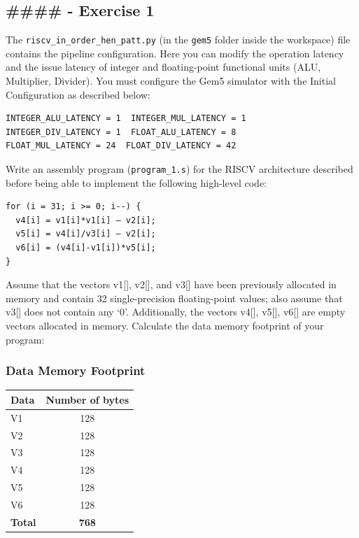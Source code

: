 \documentclass[11pt, a4paper]{article}
\begin{document}
\bigskip
\color{MyBlue}
\subsection*{\#\#\#\# - Exercise 1}
\color{black}
The \texttt{riscv\_in\_order\_hen\_patt.py} (in the \texttt{gem5} folder inside the workspace) file contains the pipeline configuration. Here you can modify the operation latency and the issue latency of integer and floating-point functional units (ALU, Multiplier, Divider).
You must configure the Gem5 simulator with the Initial Configuration as described below:
\begin{verbatim}
INTEGER_ALU_LATENCY = 1  INTEGER_MUL_LATENCY = 1
INTEGER_DIV_LATENCY = 1  FLOAT_ALU_LATENCY = 8
FLOAT_MUL_LATENCY = 24  FLOAT_DIV_LATENCY = 42
\end{verbatim}

Write an assembly program (\texttt{program\_1.s}) for the RISCV architecture described before being able to implement the following high-level code:
\begin{verbatim}
for (i = 31; i >= 0; i--) {
  v4[i] = v1[i]*v1[i] – v2[i];
  v5[i] = v4[i]/v3[i] – v2[i];
  v6[i] = (v4[i]-v1[i])*v5[i];
}
\end{verbatim}
Assume that the vectors v1[], v2[], and v3[] have been previously allocated in memory and contain 32 single-precision floating-point values; also assume that v3[] does not contain any ‘0’. Additionally, the vectors v4[], v5[], v6[] are empty vectors allocated in memory. Calculate the data memory footprint of your program:

\subsubsection*{Data Memory Footprint}
\begin{table}[h]
\centering
\begin{tabular}{|l|c|}
\hline
\textbf{Data} & \textbf{Number of bytes} \\ \hline
V1 & 128 \\ \hline
V2 & 128 \\ \hline
V3 & 128 \\ \hline
V4 & 128 \\ \hline
V5 & 128 \\ \hline
V6 & 128 \\ \hline
\textbf{Total} & \textbf{768} \\ \hline
\end{tabular}
\end{table}
\end{document}
